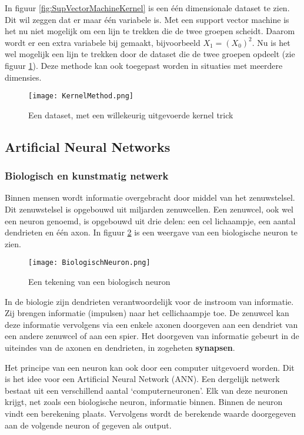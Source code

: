 In figuur \ref{fig:SupVectorMachineKernel} is een \'{e}\'{e}n dimensionale dataset te zien. Dit wil zeggen dat er maar \'{e}\'{e}n variabele is. Met een support vector machine is het nu niet mogelijk om een lijn te trekken die de twee groepen scheidt. Daarom wordt er een extra variabele bij gemaakt, bijvoorbeeld $X_{1} = (X_{0})^{2}$. Nu is het wel mogelijk een lijn te trekken door de dataset die de twee groepen opdeelt (zie figuur \ref{fig:SupVectorMachine2}). Deze methode kan ook toegepast worden in situaties met meerdere dimensies.

\begin{figure}[H]
  \centering
    \texttt{[image: KernelMethod.png]}
  \caption{Een dataset, met een willekeurig uitgevoerde kernel trick}
  \label{fig:SupVectorMachine2}
\end{figure}


\subsection{Artificial Neural Networks}
\subsubsection{Biologisch en kunstmatig netwerk}
Binnen mensen wordt informatie overgebracht door middel van het zenuwstelsel. Dit zenuwstelsel is opgebouwd uit miljarden zenuwcellen. Een zenuwcel, ook wel een neuron genoemd, is opgebouwd uit drie delen: een cel lichaampje, een aantal dendrieten en \'{e}\'{e}n axon. In figuur \ref{fig:BiologischNeuron} is een weergave van een biologische neuron te zien.

\begin{figure}[h]
  \centering
    \texttt{[image: BiologischNeuron.png]}
  \caption{Een tekening van een biologisch neuron}
  \label{fig:BiologischNeuron}
\end{figure}

In de biologie zijn dendrieten verantwoordelijk voor de instroom van informatie. Zij brengen informatie (impulsen) naar het cellichaampje toe. De zenuwcel kan deze informatie vervolgens via een enkele axonen doorgeven aan een dendriet van een andere zenuwcel of aan een spier. Het doorgeven van informatie gebeurt in de uiteindes van de axonen en dendrieten, in zogeheten \textbf{synapsen}.

Het principe van een neuron kan ook door een computer uitgevoerd worden. Dit is het idee voor een Artificial Neural Network (ANN). Een dergelijk netwerk bestaat uit een verschillend aantal ‘computerneuronen’. Elk van deze neuronen krijgt, net zoals een biologische neuron, informatie binnen. Binnen de neuron vindt een berekening plaats. Vervolgens wordt de berekende waarde doorgegeven aan de volgende neuron of gegeven als output.

